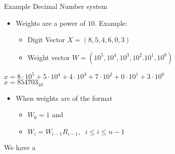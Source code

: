 \begin{parag}{Example Decimal Number system}
    \begin{itemize}
        \item Weights are a power of $10$. Example:
        \begin{itemize}
            \item Digit Vector $X = (8, 5, 4, 6, 0, 3)$
            \item Weight vector $W = (10^5, 10^4, 10^3, 10^2. 10^1, 10^0)$
        \end{itemize}
    \end{itemize}
    $x = 8 \cdot 10^5 + 5 \cdot 10^4 + 4\cdot 10^3 + 7 \cdot 10^2 + 0 \cdot 10^1 + 3 \cdot 10^0$
    \\
    $x = 854703_{10}$
    \begin{itemize}
        \item When weights are of the format
        \begin{itemize}
            \item $W_0 = 1$ and 
            \item $W_i = W_{i-1}R_{i-1}, \; \; i \leq i \leq n-1$
        \end{itemize}
    \end{itemize}
    We have a 
\end{parag}

